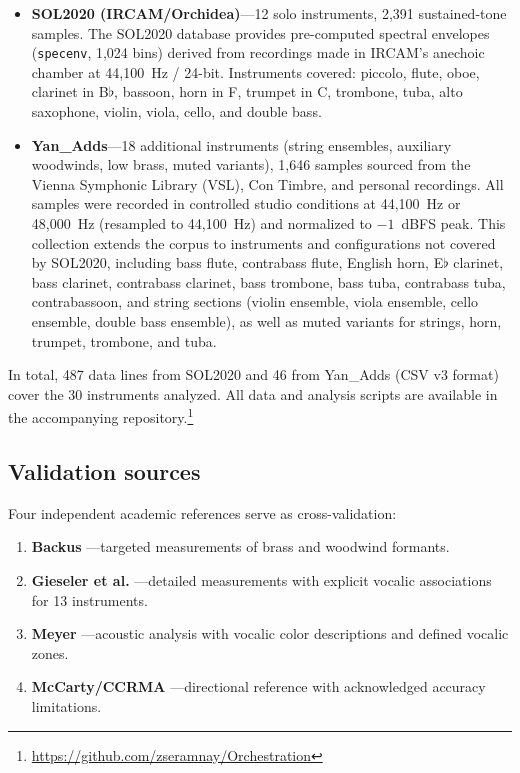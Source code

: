 \documentclass[12pt,a4paper]{article}
\begin{document}
\begin{itemize}
\item \textbf{SOL2020 (IRCAM/Orchidea)}---12 solo instruments, 2,391 sustained-tone
samples. The SOL2020 database provides pre-computed spectral envelopes
(\texttt{specenv}, 1,024 bins) derived from recordings made in IRCAM's
anechoic chamber at 44,100~Hz / 24-bit. Instruments covered: piccolo, flute,
oboe, clarinet in B$\flat$, bassoon, horn in F, trumpet in C, trombone, tuba,
alto saxophone, violin, viola, cello, and double bass.

\item \textbf{Yan\_Adds}---18 additional instruments (string ensembles, auxiliary
woodwinds, low brass, muted variants), 1,646 samples sourced from the Vienna
Symphonic Library (VSL), Con Timbre, and personal recordings. All samples were
recorded in controlled studio conditions at 44,100~Hz or 48,000~Hz (resampled
to 44,100~Hz) and normalized to $-1$~dBFS peak. This collection extends the
corpus to instruments and configurations not covered by SOL2020, including
bass flute, contrabass flute, English horn, E$\flat$ clarinet, bass clarinet,
contrabass clarinet, bass trombone, bass tuba, contrabass tuba, contrabassoon,
and string sections (violin ensemble, viola ensemble, cello ensemble, double
bass ensemble), as well as muted variants for strings, horn, trumpet,
trombone, and tuba.
\end{itemize}

In total, 487 data lines from SOL2020 and 46 from Yan\_Adds (CSV v3 format)
cover the 30 instruments analyzed. All data and analysis scripts are available
in the accompanying repository.\footnote{\url{https://github.com/zseramnay/Orchestration}}

\subsection{Validation sources}

Four independent academic references serve as cross-validation:

\begin{enumerate}
\item \textbf{Backus} \citep{Backus1969}---targeted measurements of brass and
woodwind formants.
\item \textbf{Gieseler et al.} \citep{Gieseler1985}---detailed measurements with
explicit vocalic associations for 13 instruments.
\item \textbf{Meyer} \citep{Meyer2009}---acoustic analysis with vocalic color
descriptions and defined vocalic zones.
\item \textbf{McCarty/CCRMA} \citep{McCarty2003}---directional reference with
acknowledged accuracy limitations.
\end{enumerate}
\end{document}
